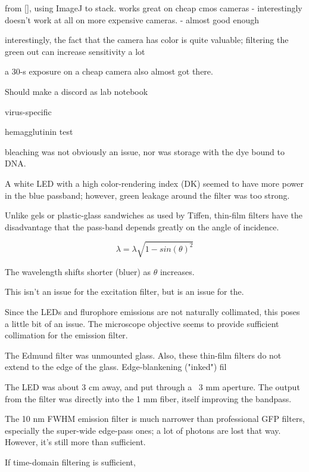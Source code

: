 \documentclass[paper.tex]{subfiles}
\begin{document}
from [], using ImageJ to stack. works great on cheap cmos cameras - interestingly doesn't work at all on more expensive cameras. - almost good enough

interestingly, the fact that the camera has color is quite valuable; filtering the green out can increase sensitivity a lot

a 30-s exposure on a cheap camera also almost got there.

Should make a discord as lab notebook


virus-specific

hemagglutinin test



bleaching was not obviously an issue, nor was storage with the dye bound to DNA.


A white LED with a high color-rendering index (DK) seemed to have more power in the blue passband; however, green leakage around the filter was too strong. 

Unlike gels or plastic-glass sandwiches as used by Tiffen, thin-film filters have the disadvantage that the pass-band depends greatly on the angle of incidence.  

$$\lambda = \lambda \sqrt{1-sin(\theta)^2}$$

The wavelength shifts shorter (bluer) as $\theta$ increases.

This isn't an issue for the excitation filter, but is an issue for the.

Since the LEDs and flurophore emissions are not naturally collimated, this poses a little bit of an issue.
The microscope objective seems to provide sufficient collimation for the emission filter.

The Edmund filter was unmounted glass. Also, these thin-film filters do not extend to the edge of the glass. Edge-blankening ("inked") fil

The LED was about 3 cm away, and put through a ~3 mm aperture. The output from the filter was directly into the 1 mm fiber, itself improving the bandpass.





The 10 nm FWHM emission filter is much narrower than professional GFP filters, especially the super-wide edge-pass ones; a lot of photons are lost that way. However, it's still more than sufficient. 






If time-domain filtering is sufficient, 
\end{document}
